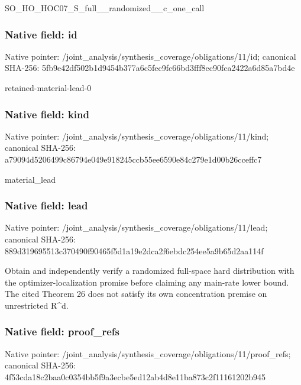 \documentclass[10pt,a4paper]{article}
\begin{document}
\begingroup\raggedright\sloppy SO\_\allowbreak{}HO\_\allowbreak{}HOC07\_\allowbreak{}S\_\allowbreak{}full\_\allowbreak{}\_\allowbreak{}randomized\_\allowbreak{}\_\allowbreak{}c\_\allowbreak{}one\_\allowbreak{}call\par\endgroup

\subsubsection{Native field: id}
Native pointer: /joint\_\allowbreak{}analysis/synthesis\_\allowbreak{}coverage/obligations/11/id; canonical SHA-256: 5fb9e42df502b1d9454b377a6c5fec9fc66bd3fff8ec90fca2422a6d85a7bd4e

\begingroup\raggedright\sloppy retained-material-lead-0\par\endgroup

\subsubsection{Native field: kind}
Native pointer: /joint\_\allowbreak{}analysis/synthesis\_\allowbreak{}coverage/obligations/11/kind; canonical SHA-256: a79094d5206499c86794e049e918245ccb55ee6590e84c279e1d00b26cceffc7

\begingroup\raggedright\sloppy material\_\allowbreak{}lead\par\endgroup

\subsubsection{Native field: lead}
Native pointer: /joint\_\allowbreak{}analysis/synthesis\_\allowbreak{}coverage/obligations/11/lead; canonical SHA-256: 889d319695513c370490f90465f5d1a19e2dca2f6ebdc254ee5a9b65d2aa114f

\begingroup\raggedright\sloppy Obtain and independently verify a randomized full-space hard distribution with the optimizer-localization promise before claiming any main-rate lower bound. The cited Theorem 26 does not satisfy its own concentration premise on unrestricted R\textasciicircum{}d.\par\endgroup

\subsubsection{Native field: proof\_\allowbreak{}refs}
Native pointer: /joint\_\allowbreak{}analysis/synthesis\_\allowbreak{}coverage/obligations/11/proof\_\allowbreak{}refs; canonical SHA-256: 4f53cda18c2baa0c0354bb5f9a3ecbe5ed12ab4d8e11ba873c2f11161202b945
\end{document}
